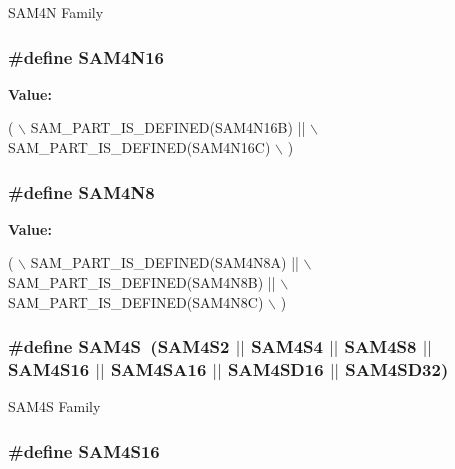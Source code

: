 S\-A\-M4\-N Family \hypertarget{group__sam__part__macros__group_gad92bacc1b6c870d806f48e8195527911}{
\subsubsection[{S\-A\-M4\-N16}]{\setlength{\rightskip}{0pt plus 5cm}\#define S\-A\-M4\-N16}}\label{group__sam__part__macros__group_gad92bacc1b6c870d806f48e8195527911}
{\bfseries Value\-:}
\begin{DoxyCode}
( \(\backslash\)
                SAM\_PART\_IS\_DEFINED(SAM4N16B) || \(\backslash\)
                SAM\_PART\_IS\_DEFINED(SAM4N16C) \(\backslash\)
                )
\end{DoxyCode}
\hypertarget{group__sam__part__macros__group_ga820cb6819d43d98db4ea8ee4d40adb8a}{
\subsubsection[{S\-A\-M4\-N8}]{\setlength{\rightskip}{0pt plus 5cm}\#define S\-A\-M4\-N8}}\label{group__sam__part__macros__group_ga820cb6819d43d98db4ea8ee4d40adb8a}
{\bfseries Value\-:}
\begin{DoxyCode}
( \(\backslash\)
                SAM\_PART\_IS\_DEFINED(SAM4N8A) || \(\backslash\)
                SAM\_PART\_IS\_DEFINED(SAM4N8B) || \(\backslash\)
                SAM\_PART\_IS\_DEFINED(SAM4N8C) \(\backslash\)
                )
\end{DoxyCode}
\hypertarget{group__sam__part__macros__group_gac3e6ef71bec5113415a64bb14ce8be24}{
\subsubsection[{S\-A\-M4\-S}]{\setlength{\rightskip}{0pt plus 5cm}\#define S\-A\-M4\-S~(S\-A\-M4\-S2 $|$$|$ S\-A\-M4\-S4 $|$$|$ S\-A\-M4\-S8 $|$$|$ S\-A\-M4\-S16 $|$$|$ S\-A\-M4\-S\-A16 $|$$|$ S\-A\-M4\-S\-D16 $|$$|$ S\-A\-M4\-S\-D32)}}\label{group__sam__part__macros__group_gac3e6ef71bec5113415a64bb14ce8be24}
S\-A\-M4\-S Family \hypertarget{group__sam__part__macros__group_ga1c3c5c80f2c2ca26604ff5d59cb3a0b2}{
\subsubsection[{S\-A\-M4\-S16}]{\setlength{\rightskip}{0pt plus 5cm}\#define S\-A\-M4\-S16}}\label{group__sam__part__macros__group_ga1c3c5c80f2c2ca26604ff5d59cb3a0b2}
